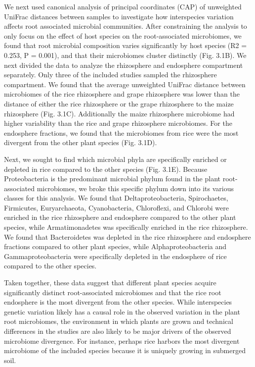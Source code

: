 We next used canonical analysis of principal coordinates (CAP) of unweighted UniFrac distances between samples to investigate how interspecies variation affects root associated microbial communities. After constraining the analysis to only focus on the effect of host species on the root-associated microbiomes, we found that root microbial composition varies significantly by host species (R2 = 0.253, P = 0.001), and that their microbiomes cluster distinctly (Fig. 3.1B). We next divided the data to analyze the rhizosphere and endosphere compartment separately. Only three of the included studies sampled the rhizosphere compartment. We found that the average unweighted UniFrac distance between microbiomes of the rice rhizosphere and grape rhizosphere was lower than the distance of either the rice rhizosphere or the grape rhizosphere to the maize rhizosphere (Fig. 3.1C). Additionally the maize rhizosphere microbiome had higher variability than the rice and grape rhizosphere microbiomes. For the endosphere fractions, we found that the microbiomes from rice were the most divergent from the other plant species (Fig. 3.1D).

Next, we sought to find which microbial phyla are specifically enriched or depleted in rice compared to the other species (Fig. 3.1E). Because Proteobacteria is the predominant microbial phylum found in the plant root-associated microbiomes, we broke this specific phylum down into its various classes for this analysis. We found that Deltaproteobacteria, Spirochaetes, Firmicutes, Euryarchaeota, Cyanobacteria, Chloroflexi, and Chlorobi were enriched in the rice rhizosphere and endosphere compared to the other plant species, while Armatimonadetes was specifically enriched in the rice rhizosphere. We found that Bacteroidetes was depleted in the rice rhizosphere and endosphere fractions compared to other plant species, while Alphaproteobacteria and Gammaproteobacteria were specifically depleted in the endosphere of rice compared to the other species.  

Taken together, these data suggest that different plant species acquire significantly distinct root-associated microbiomes and that the rice root endosphere is the most divergent from the other species. While interspecies genetic variation likely has a causal role in the observed variation in the plant root microbiomes, the environment in which plants are grown and technical differences in the studies are also likely to be major drivers of the observed microbiome divergence. For instance, perhaps rice harbors the most divergent microbiome of the included species because it is uniquely growing in submerged soil.


